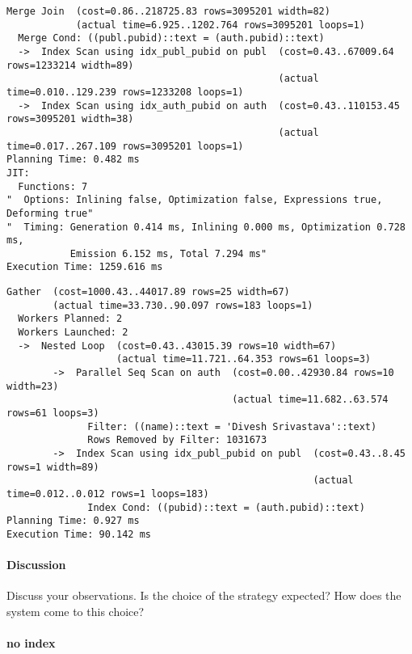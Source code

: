 \documentclass[11pt]{scrartcl}
\begin{document}
{\small
\parskip0pt\begin{verbatim}
Merge Join  (cost=0.86..218725.83 rows=3095201 width=82)
            (actual time=6.925..1202.764 rows=3095201 loops=1)
  Merge Cond: ((publ.pubid)::text = (auth.pubid)::text)
  ->  Index Scan using idx_publ_pubid on publ  (cost=0.43..67009.64 rows=1233214 width=89)
                                               (actual time=0.010..129.239 rows=1233208 loops=1)
  ->  Index Scan using idx_auth_pubid on auth  (cost=0.43..110153.45 rows=3095201 width=38)
                                               (actual time=0.017..267.109 rows=3095201 loops=1)
Planning Time: 0.482 ms
JIT:
  Functions: 7
"  Options: Inlining false, Optimization false, Expressions true, Deforming true"
"  Timing: Generation 0.414 ms, Inlining 0.000 ms, Optimization 0.728 ms,
           Emission 6.152 ms, Total 7.294 ms"
Execution Time: 1259.616 ms
\end{verbatim}}



{\small
\parskip0pt\begin{verbatim}
Gather  (cost=1000.43..44017.89 rows=25 width=67)
        (actual time=33.730..90.097 rows=183 loops=1)
  Workers Planned: 2
  Workers Launched: 2
  ->  Nested Loop  (cost=0.43..43015.39 rows=10 width=67)
                   (actual time=11.721..64.353 rows=61 loops=3)
        ->  Parallel Seq Scan on auth  (cost=0.00..42930.84 rows=10 width=23)
                                       (actual time=11.682..63.574 rows=61 loops=3)
              Filter: ((name)::text = 'Divesh Srivastava'::text)
              Rows Removed by Filter: 1031673
        ->  Index Scan using idx_publ_pubid on publ  (cost=0.43..8.45 rows=1 width=89)
                                                     (actual time=0.012..0.012 rows=1 loops=183)
              Index Cond: ((pubid)::text = (auth.pubid)::text)
Planning Time: 0.927 ms
Execution Time: 90.142 ms
\end{verbatim}}

\paragraph{Discussion}

Discuss your observations.
Is the choice of the strategy expected?
How does the system come to this choice?

\paragraph{no index}
\end{document}
